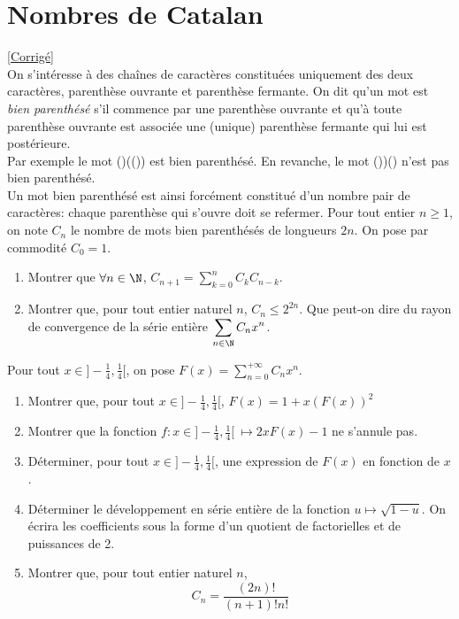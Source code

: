 \documentclass[8pt]{book}
\begin{document}
\section{Nombres de Catalan }
\label{Nombres de Catalan}
\textcolor{blue}{\hyperref[Nombres de Catalan corrigé]{[Corrigé]}}\\
On s'intéresse à des chaînes de caractères constituées uniquement des deux caractères, parenthèse ouvrante et parenthèse fermante. On dit qu'un mot est \textit{bien parenthésé} s'il commence par une parenthèse ouvrante et qu'à toute parenthèse ouvrante est associée une (unique) parenthèse fermante qui lui est postérieure.
\\Par exemple le mot ()(()) est bien parenthésé. En revanche, le mot ())() n'est pas bien parenthésé.
\\Un mot bien parenthésé est ainsi forcément constitué d'un nombre pair de caractères: chaque parenthèse qui s'ouvre doit se refermer.
Pour tout entier $n\geq 1$, on note $C_n$ le nombre de mots bien parenthésés de longueurs $2n$. On pose par commodité $C_0=1$.
\begin{enumerate}
	\item Montrer que $\forall n\in\N$, $C_{n+1}=\displaystyle\sum\limits_{k=0}^{n}C_kC_{n-k}$.
	\item Montrer que, pour tout entier naturel $n$, $C_n\leq 2^{2n}.$ Que peut-on dire du rayon de convergence de la série entière $\displaystyle\sum_{n\in \N} C_nx^n$.
	\setcounter{num}{\value{enumi}}
\end{enumerate}
Pour tout $x\in]-\displaystyle\frac{1}{4},\frac{1}{4}[$, on pose $F(x)=\displaystyle\sum\limits_{n=0}^{+\infty}C_nx^n$.
\begin{enumerate}
	\setcounter{enumi}{\value{num}}
	\item Montrer que, pour tout $x\in]-\displaystyle\frac{1}{4},\frac{1}{4}[$, $F(x)=1+x(F(x))^2$
	\item Montrer que la fonction $f:x\in]-\displaystyle\frac{1}{4},\frac{1}{4}[\ \mapsto2xF(x)-1$ ne s'annule pas.
	\item Déterminer, pour tout $x\in]-\displaystyle\frac{1}{4},\frac{1}{4}[$, une expression de $F(x)$ en fonction de $x$.
	\item Déterminer le développement en série entière de la fonction $u\mapsto\sqrt{1-u}$. On écrira les coefficients sous la forme d'un quotient de factorielles et de puissances de 2.
	\item Montrer que, pour tout entier naturel $n$, $$C_n=\frac{(2n)!}{(n+1)!n!}$$
\end{enumerate}
\end{document}
